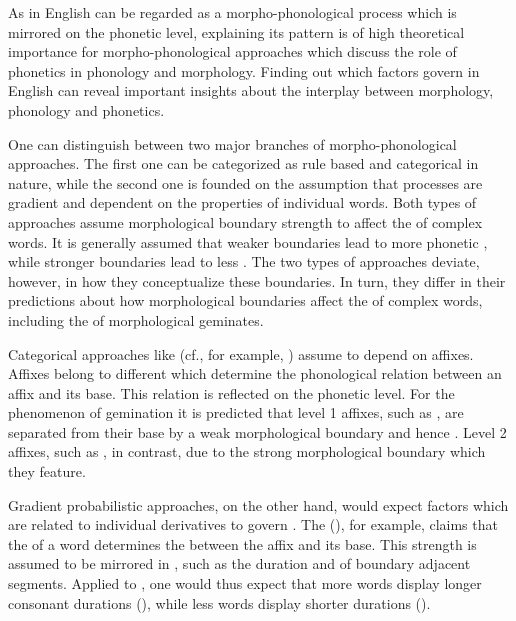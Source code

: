 As  in English  can be regarded as a morpho-phonological process which is mirrored on the phonetic level, explaining its pattern is of high theoretical importance for morpho-phonological approaches which discuss the role of phonetics in phonology and morphology. Finding out which factors govern  in English  can reveal important insights about  the interplay between morphology, phonology and phonetics.

One can distinguish between two major branches of morpho-phonological approaches. The first one can be categorized as rule based and  categorical in nature, while the second one is founded on the assumption that processes are gradient and dependent on the properties of individual words. 
Both types of approaches assume  morphological boundary strength to affect the  of complex words. 
It is generally assumed that weaker boundaries lead to more phonetic , while stronger boundaries lead to less . 
The two types of approaches deviate, however, in how they conceptualize these boundaries. In turn, they differ in their predictions about how morphological boundaries affect the  of complex words, including the  of morphological geminates.
 

Categorical approaches like  (cf., for example, \citealt{Kiparsky.1982,Mohanan.1986}) assume  to depend on affixes. Affixes belong to different  which determine the phonological relation between an affix and its base. This relation is reflected on the phonetic level. 
For the phenomenon of {gemination} it is predicted that level 1 affixes, such as , are separated from their base by a weak morphological boundary and hence . Level 2 affixes, such as , in contrast,  due to the strong morphological boundary which they feature. 

Gradient probabilistic approaches, on the other hand, would expect factors which are related to individual derivatives to govern . The  (\citealt{Hay.2003}), for example, claims that the  of a word determines the  between the affix and its base. This strength is assumed to be mirrored in , such as the duration and  of boundary adjacent segments. Applied to , one would thus expect that more  words display longer consonant durations (), while less  words display shorter durations (). 


